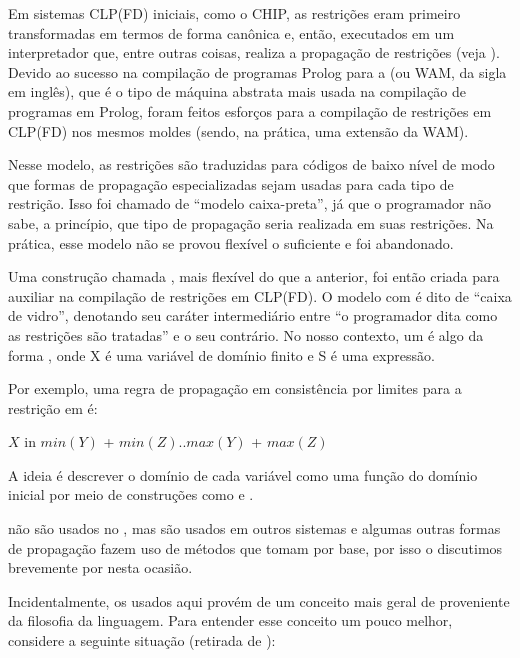 \documentclass{article}
\begin{document}
Em sistemas CLP(FD) iniciais, como o CHIP, as restrições eram primeiro
transformadas em termos de forma canônica e, então, executados em um
interpretador que, entre outras coisas, realiza a propagação de
restrições (veja \cite{zhou}).  Devido ao sucesso na compilação de
programas Prolog para a  (ou WAM,
da sigla em inglês), que é o tipo de máquina abstrata mais usada na
compilação de programas em Prolog, foram feitos esforços para a
compilação de restrições em CLP(FD) nos mesmos moldes (sendo, na
prática, uma extensão da WAM).

Nesse modelo, as restrições são traduzidas para códigos de baixo nível
de modo que formas de propagação especializadas sejam usadas para cada
tipo de restrição. Isso foi chamado de ``modelo caixa-preta'', já que
o programador não sabe, a princípio, que tipo de propagação seria
realizada em suas restrições. Na prática, esse modelo não se provou
flexível o suficiente e foi abandonado.

Uma construção chamada , mais flexível do que a
anterior, foi então criada para auxiliar na compilação de restrições
em CLP(FD). O modelo com  é dito de ``caixa de
vidro'', denotando seu caráter intermediário entre ``o programador
dita como as restrições são tratadas'' e o seu contrário. No nosso
contexto, um  é algo da forma ,
onde X é uma variável de domínio finito e S é uma expressão.

Por exemplo, uma regra de propagação em consistência por limites para
a restrição   em  é:

$X$ in $min(Y)$ + $min(Z)..max(Y)$ + $max(Z)$

A ideia é descrever o domínio de cada variável como uma função do
domínio inicial por meio de construções como  e
.

 não são usados no \eclipse, mas são usados em
outros sistemas e algumas outras formas de propagação fazem uso de
métodos que tomam  por base, por isso o
discutimos brevemente por nesta ocasião.

Incidentalmente, os  usados aqui provém de um
conceito mais geral de  proveniente da filosofia
da linguagem.  Para entender esse conceito um pouco melhor, considere
a seguinte situação (retirada de \cite{raymond}):
\end{document}
